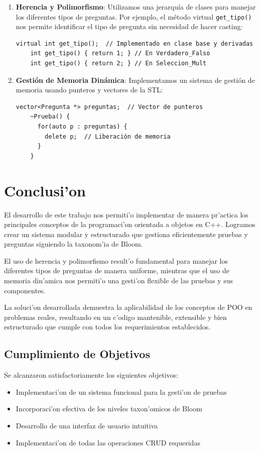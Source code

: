 \documentclass[12pt]{article}
\begin{document}
\begin{enumerate}
    \item \textbf{Herencia y Polimorfismo}: Utilizamos una jerarqu\'ia de clases para manejar los diferentes tipos de preguntas. Por ejemplo, el m\'etodo virtual \texttt{get\_tipo()} nos permite identificar el tipo de pregunta sin necesidad de hacer casting:
    \begin{lstlisting}[style=customc]
    virtual int get_tipo();  // Implementado en clase base y derivadas
    int get_tipo() { return 1; } // En Verdadero_Falso
    int get_tipo() { return 2; } // En Seleccion_Mult
    \end{lstlisting}

    \item \textbf{Gesti\'on de Memoria Din\'amica}: Implementamos un sistema de gesti\'on de memoria usando punteros y vectores de la STL:
    \begin{lstlisting}[style=customc]
    vector<Pregunta *> preguntas;  // Vector de punteros
    ~Prueba() {
      for(auto p : preguntas) {
        delete p;  // Liberación de memoria
      }
    }
    \end{lstlisting}
\end{enumerate}

\section{Conclusi'on}
El desarrollo de este trabajo nos permiti'o implementar de manera pr'actica los principales conceptos de la programaci'on orientada a objetos en C++. Logramos crear un sistema modular y estructurado que gestiona eficientemente pruebas y preguntas siguiendo la taxonom'ia de Bloom.

El uso de herencia y polimorfismo result'o fundamental para manejar los diferentes tipos de preguntas de manera uniforme, mientras que el uso de memoria din'amica nos permiti'o una gesti'on flexible de las pruebas y sus componentes.

La soluci'on desarrollada demuestra la aplicabilidad de los conceptos de POO en problemas reales, resultando en un c'odigo mantenible, extensible y bien estructurado que cumple con todos los requerimientos establecidos.

\subsection{Cumplimiento de Objetivos}
Se alcanzaron satisfactoriamente los siguientes objetivos:
\begin{itemize}
    \item Implementaci'on de un sistema funcional para la gesti'on de pruebas
    \item Incorporaci'on efectiva de los niveles taxon'omicos de Bloom
    \item Desarrollo de una interfaz de usuario intuitiva
    \item Implementaci'on de todas las operaciones CRUD requeridas
\end{itemize}
\end{document}
